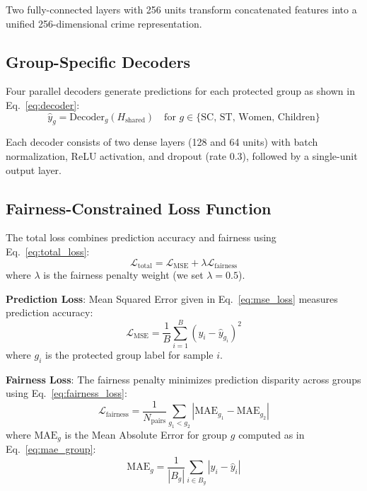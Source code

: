\documentclass[conference]{IEEEtran}
\begin{document}
Two fully-connected layers with 256 units transform concatenated features into a unified 256-dimensional crime representation.

\subsection{Group-Specific Decoders}

Four parallel decoders generate predictions for each protected group as shown in Eq.~\eqref{eq:decoder}:
\begin{equation}
\hat{y}_g = \text{Decoder}_g(H_{\text{shared}}) \quad \text{for } g \in \{\text{SC, ST, Women, Children}\}
\label{eq:decoder}
\end{equation}

Each decoder consists of two dense layers (128 and 64 units) with batch normalization, ReLU activation, and dropout (rate 0.3), followed by a single-unit output layer.

\subsection{Fairness-Constrained Loss Function}

The total loss combines prediction accuracy and fairness using Eq.~\eqref{eq:total_loss}:
\begin{equation}
\mathcal{L}_{\text{total}} = \mathcal{L}_{\text{MSE}} + \lambda \mathcal{L}_{\text{fairness}}
\label{eq:total_loss}
\end{equation}
where $\lambda$ is the fairness penalty weight (we set $\lambda = 0.5$).

\textbf{Prediction Loss}: Mean Squared Error given in Eq.~\eqref{eq:mse_loss} measures prediction accuracy:
\begin{equation}
\mathcal{L}_{\text{MSE}} = \frac{1}{B} \sum_{i=1}^{B} (y_i - \hat{y}_{g_i})^2
\label{eq:mse_loss}
\end{equation}
where $g_i$ is the protected group label for sample $i$.

\textbf{Fairness Loss}: The fairness penalty minimizes prediction disparity across groups using Eq.~\eqref{eq:fairness_loss}:
\begin{equation}
\mathcal{L}_{\text{fairness}} = \frac{1}{N_{\text{pairs}}} \sum_{g_1 < g_2} |\text{MAE}_{g_1} - \text{MAE}_{g_2}|
\label{eq:fairness_loss}
\end{equation}
where $\text{MAE}_g$ is the Mean Absolute Error for group $g$ computed as in Eq.~\eqref{eq:mae_group}:
\begin{equation}
\text{MAE}_g = \frac{1}{|B_g|} \sum_{i \in B_g} |y_i - \hat{y}_i|
\label{eq:mae_group}
\end{equation}
\end{document}
